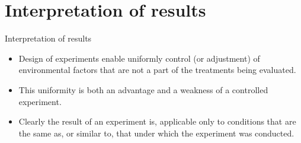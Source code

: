 \documentclass[
  ignorenonframetext,
  aspectratio=169]{beamer}
\providecommand{\tightlist}{%
  \setlength{\itemsep}{0pt}\setlength{\parskip}{0pt}}
\begin{document}
\hypertarget{interpretation-of-results}{%
\section{Interpretation of results}\label{interpretation-of-results}}

\begin{frame}{Interpretation of results}
\protect\hypertarget{interpretation-of-results-1}{}
\begin{itemize}[<+->]
\tightlist
\item
  Design of experiments enable uniformly control (or adjustment) of
  environmental factors that are not a part of the treatments being
  evaluated.
\item
  This uniformity is both an advantage and a weakness of a controlled
  experiment.
\item
  Clearly the result of an experiment is, applicable only to conditions
  that are the same as, or similar to, that under which the experiment
  was conducted.
\end{itemize}
\end{frame}
\end{document}
